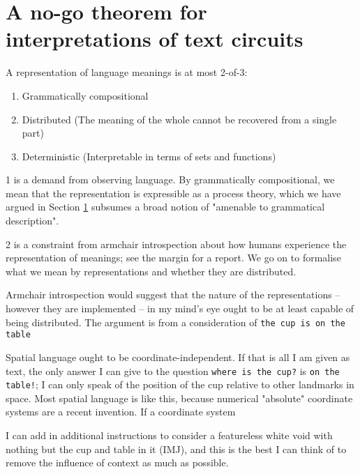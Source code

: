 \section{A no-go theorem for interpretations of text circuits}

\begin{theorem}[NO-GO]
A representation of language meanings is at most 2-of-3:\\
\begin{enumerate}
\item{Grammatically compositional}
\item{Distributed (The meaning of the whole cannot be recovered from a single part)}
\item{Deterministic (Interpretable in terms of sets and functions)}
\end{enumerate}
\end{theorem}

1 is a demand from observing language. By grammatically compositional, we mean that the representation is expressible as a process theory, which we have argued in Section \ref{} subsumes a broad notion of "amenable to grammatical description".

2 is a constraint from armchair introspection about how humans experience the representation of meanings; see the margin for a report. We go on to formalise what we mean by representations and whether they are distributed.

Armchair introspection would suggest that the nature of the representations -- however they are implemented -- in my mind's eye ought to be at least capable of being distributed. The argument is from a consideration of \texttt{the cup is on the table}

Spatial language ought to be coordinate-independent. If that is all I am given as text, the only answer I can give to the question \texttt{where is the cup?} is \texttt{on the table!}; I can only speak of the position of the cup relative to other landmarks in space. Most spatial language is like this, because numerical "absolute" coordinate systems are a recent invention. If a coordinate system 

I can add in additional instructions to consider a featureless white void with nothing but the cup and table in it (IMJ), and this is the best I can think of to remove the influence of context as much as possible.


